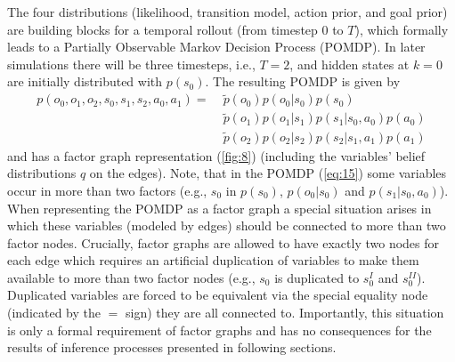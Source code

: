 The four distributions (likelihood, transition model, action prior, and goal prior) are building blocks for a temporal rollout (from timestep \(0\) to \(T\)), which formally leads to a Partially Observable Markov Decision Process (POMDP). In later simulations there will be three timesteps, i.e., \(T=2\), and hidden states at \(k=0\) are initially distributed with \(p(s_0)\). The resulting POMDP is given by
\begin{equation}
    \begin{split}
        p(o_0, o_1, o_2, s_0, s_1, s_2, a_0, a_1) = \; & \tilde{p}(o_0) p(o_0|s_0) p(s_0)                \\
                                                       & \tilde{p}(o_1) p(o_1|s_1) p(s_1|s_0,a_0) p(a_0) \\
                                                       & \tilde{p}(o_2) p(o_2|s_2) p(s_2|s_1,a_1) p(a_1)
        \label{eq:15}
    \end{split}
\end{equation}
and has a factor graph representation (\cref{fig:8}) (including the variables' belief distributions \(q\) on the edges). Note, that in the POMDP (\cref{eq:15}) some variables occur in more than two factors (e.g., \(s_0\) in \(p(s_0)\), \(p(o_0|s_0)\) and \(p(s_1|s_0,a_0)\)). When representing the POMDP as a factor graph a special situation arises in which these variables (modeled by edges) should be connected to more than two factor nodes. Crucially, factor graphs are allowed to have exactly two nodes for each edge which requires an artificial duplication of variables to make them available to more than two factor nodes (e.g., \(s_0\) is duplicated to \(s^{\scriptscriptstyle I}_0\) and \(s^{\scriptscriptstyle II}_0\)). Duplicated variables are forced to be equivalent via the special equality node (indicated by the \(=\) sign) they are all connected to. Importantly, this situation is only a formal requirement of factor graphs and has no consequences for the results of inference processes presented in following sections.

